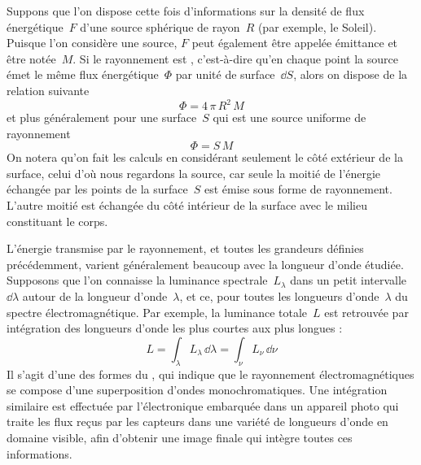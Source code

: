 \begin{finger}
\item Suppons que l'on dispose cette fois d'informations sur la densité de flux énergétique~$F$ d'une source sphérique de rayon~$R$ (par exemple, le Soleil). Puisque l'on considère une source, $F$ peut également être appelée émittance et être notée~$M$. Si le rayonnement est , c'est-à-dire qu'en chaque point la source émet le même flux énergétique~$\Phi$ par unité de surface~$\dd S$, alors on dispose de la relation suivante $$ \Phi = 4\,\pi\,R^2 \, M$$ et plus généralement pour une surface~$S$ qui est une source uniforme de rayonnement $$ \boxed{ \Phi = S \, M } $$ On notera qu'on fait les calculs en considérant seulement le côté extérieur de la surface, celui d'où nous regardons la source, car seule la moitié de l'énergie échangée par les points de la surface~$S$ est émise sous forme de rayonnement. L'autre moitié est échangée du côté intérieur de la surface avec le milieu constituant le corps. 
\item L'énergie transmise par le rayonnement, et toutes les grandeurs définies précédemment, varient généralement beaucoup avec la longueur d'onde étudiée. Supposons que l'on connaisse la luminance spectrale~$L_\lambda$ dans un petit intervalle~$\dd \lambda$ autour de la longueur d'onde~$\lambda$, et ce, pour toutes les longueurs d'onde~$\lambda$ du spectre électromagnétique. Par exemple, la luminance totale~$L$ est retrouvée par intégration des longueurs d'onde les plus courtes aux plus longues : $$L=\int_{\lambda} L_\lambda \, \dd\lambda = \int_\nu L_\nu \, \dd \nu $$ Il s'agit d'une des formes du , qui indique que le rayonnement électromagnétiques se compose d'une superposition d'ondes monochromatiques. Une intégration similaire est effectuée par l'électronique embarquée dans un appareil photo qui traite les flux reçus par les capteurs dans une variété de longueurs d'onde en domaine visible, afin d'obtenir une image finale qui intègre toutes ces informations.
\end{finger}

